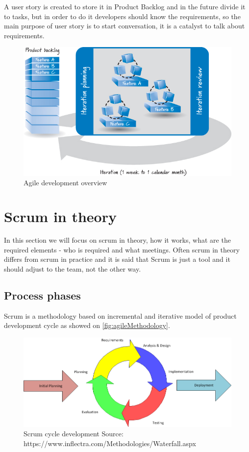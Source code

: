 A user story is created to store it in Product Backlog and in the future divide it to tasks, but in order to do it developers should know the requirements, so the main purpose of user story is to start conversation, it is a catalyst to talk about requirements.

\begin{figure}[h]
\caption{Agile development overview \cite{ScrumBook}}
\label{fig:agileDiagram}
\centering
\includegraphics[width=1\textwidth]{img/agileDiagram}
\end{figure}

\section{Scrum in theory}
In this section we will focus on scrum in theory, how it works, what are the required elements - who is required and what meetings. Often scrum in theory differs from scrum in practice and it is said that Scrum is just a tool and it should adjust to the team, not the other way.
\subsection{Process phases}
Scrum is a methodology based on incremental and iterative model of product development cycle as showed on \autoref{fig:agileMethodology}.

\begin{figure}[h]
\caption{ Scrum cycle development \break Source: https://www.inflectra.com/Methodologies/Waterfall.aspx}
\label{fig:agileMethodology}
\centering
\includegraphics[width=1\textwidth]{img/iterativeScrum}
\end{figure}

